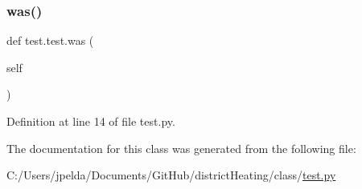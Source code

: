 \subsubsection{\texorpdfstring{was()}{was()}}
{\footnotesize\ttfamily def test.\+test.\+was (\begin{DoxyParamCaption}\item[{}]{self }\end{DoxyParamCaption})}



Definition at line 14 of file test.\+py.



The documentation for this class was generated from the following file\+:\begin{DoxyCompactItemize}
\item 
C\+:/\+Users/jpelda/\+Documents/\+Git\+Hub/district\+Heating/class/\hyperlink{test_8py}{test.\+py}\end{DoxyCompactItemize}
